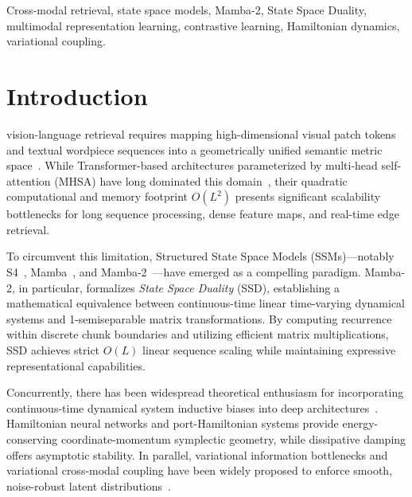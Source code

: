 \documentclass[10pt,journal,final]{IEEEtran}
\begin{document}
\begin{IEEEkeywords}
Cross-modal retrieval, state space models, Mamba-2, State Space Duality, multimodal representation learning, contrastive learning, Hamiltonian dynamics, variational coupling.
\end{IEEEkeywords}

\IEEEpeerreviewmaketitle

\section{Introduction}
\label{sec:introduction}

 vision-language retrieval requires mapping high-dimensional visual patch tokens and textual wordpiece sequences into a geometrically unified semantic metric space~\cite{radford2021learning,wang2016comprehensive}. While Transformer-based architectures parameterized by multi-head self-attention (MHSA) have long dominated this domain~\cite{vaswani2017attention,dosovitskiy2021image,liu2019roberta}, their quadratic computational and memory footprint $O(L^2)$ presents significant scalability bottlenecks for long sequence processing, dense feature maps, and real-time edge retrieval.

To circumvent this limitation, Structured State Space Models (SSMs)---notably S4~\cite{gu2022efficiently}, Mamba~\cite{gu2023mamba}, and Mamba-2~\cite{dao2024transformers}---have emerged as a compelling paradigm. Mamba-2, in particular, formalizes \textit{State Space Duality} (SSD), establishing a mathematical equivalence between continuous-time linear time-varying dynamical systems and 1-semiseparable matrix transformations. By computing recurrence within discrete chunk boundaries and utilizing efficient matrix multiplications, SSD achieves strict $O(L)$ linear sequence scaling while maintaining expressive representational capabilities.

Concurrently, there has been widespread theoretical enthusiasm for incorporating continuous-time dynamical system inductive biases into deep architectures~\cite{greydanus2019hamiltonian,vanderschaft2000}. Hamiltonian neural networks and port-Hamiltonian systems provide energy-conserving coordinate-momentum symplectic geometry, while dissipative damping offers asymptotic stability. In parallel, variational information bottlenecks and variational cross-modal coupling have been widely proposed to enforce smooth, noise-robust latent distributions~\cite{kingma2014auto,alemi2017deep}.
\end{document}
